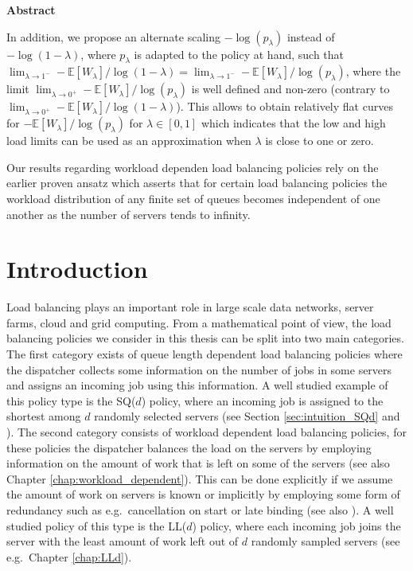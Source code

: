 \documentclass[12pt]{report}
\newcommand{\E}{\mathbb{E}}
\newenvironment{chapabstract}{%
    \begin{center}%
      \bfseries Abstract
    \end{center}}%
   {\par}
\begin{document}
\begin{chapabstract}
In addition, we propose an alternate scaling $-\log(p_\lambda)$
instead of $-\log(1-\lambda)$, where $p_\lambda$ is adapted to the policy at hand, 
such that $\lim_{\lambda\rightarrow 1^-}-\E[W_\lambda]/\log(1-\lambda)=\lim_{\lambda\rightarrow 1^-}-\E[W_\lambda]/\log(p_\lambda)$, where the limit $\lim_{\lambda\rightarrow 0^+}-\E[W_\lambda]/\log(p_\lambda)$ is well defined and non-zero (contrary to
$\lim_{\lambda\rightarrow 0^+}-\E[W_\lambda]/\log(1-\lambda)$). This allows to obtain relatively flat curves for $-\E[W_\lambda]/\log(p_\lambda)$ for $ \lambda \in [0,1]$ which indicates that the low and high load
limits can be used as an approximation when $\lambda$ is close to one or zero.

Our results regarding workload dependen load balancing policies rely on the earlier proven ansatz which asserts that 
for certain load balancing policies the workload distribution of any finite set of queues becomes independent of one another as the number of servers tends to infinity.
\end{chapabstract}
\section{Introduction}
Load balancing plays an important role in large scale data networks, server farms, cloud and grid computing. From a mathematical point of view, the load balancing policies we consider in this thesis can be split into two main categories. The first category exists of queue length dependent load balancing policies where the dispatcher collects some information on the number of jobs in some servers and assigns an incoming job using this information. A well studied example of this policy type is the SQ($d$) policy, where an incoming job is assigned to the shortest among $d$ randomly selected servers (see Section \ref{sec:intuition_SQd} and \cite{mitzenmacher2001power, vvedenskaya3}). The second category consists of workload dependent load balancing policies, for these policies the dispatcher balances the load on the servers by employing information on the amount of work that is left on some of the servers (see also Chapter \ref{chap:workload_dependent}). This can be done explicitly if we assume the amount of work on servers is known or implicitly by employing some form of redundancy such as e.g.~cancellation on start or late binding (see also \cite{ousterhout2013sparrow}). A well studied policy of this type is the LL($d$) policy, where each incoming job joins the server with the least amount of work left out of $d$ randomly sampled servers (see e.g.~Chapter \ref{chap:LLd}).
\end{document}
